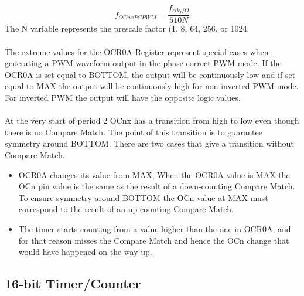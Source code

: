 \documentclass[english]{article}
\begin{document}
$$
f_{OCnxPCPWM}=\frac{f_{clk_I/O}}{510N}
$$
The N variable represents the prescale factor (1, 8, 64, 256, or 1024.\\\\
The extreme values for the OCR0A Register represent special cases when generating a PWM waveform output in the phase correct PWM mode. If the OCR0A is set equal to BOTTOM, the output will be continuously low and if set equal to MAX the output will be continuously high for non-inverted PWM mode. For inverted PWM the output will have the opposite logic values.\\\\
At the very start of period 2 OCnx has a transition from high to low even though there is no Compare Match. The point of this transition is to guarantee symmetry around BOTTOM. There are two cases that give a transition without Compare Match.
\begin{itemize}
\item OCR0A changes its value from MAX, When the OCR0A value is MAX the OCn pin value is the same as the result of a down-counting Compare Match. To ensure symmetry around BOTTOM the OCn value at MAX must correspond to the result of an up-counting Compare Match.
\item  The timer starts counting from a value higher than the one in OCR0A, and for that reason
misses the Compare Match and hence the OCn change that would have happened on the way up.
\end{itemize}
\subsection{16-bit Timer/Counter}
\end{document}
